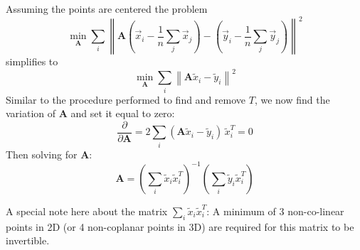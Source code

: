 Assuming the points are centered the problem
\begin{equation}
\underset{\mathbf{A}}{\min}\sum_i\left\|\mathbf{A}\left(\vec{x}_i-\frac{1}{n}\sum_j \vec{x}_j\right) - \left(\vec{y}_i-\frac{1}{n}\sum_j \vec{y}_j\right)\right\|^2
\end{equation}
simplifies to
\begin{equation}
\underset{\mathbf{A}}{\min}\sum_i\left\|\mathbf{A}\tilde{x}_i - \tilde{y}_i\right\|^2
\end{equation}
Similar to the procedure performed to find and remove $T$, we now find the variation of $\mathbf{A}$ and set it equal to zero:
\begin{equation}
\frac{\partial}{\partial\mathbf{A}} = 2 \sum_i \left(\mathbf{A}\tilde{x}_i-\tilde{y}_i\right)\, \tilde{x}_i^T = 0
\end{equation}
Then solving for $\mathbf{A}$:
\begin{equation}
\mathbf{A}=\left(\sum_i\tilde{x}_i\tilde{x}_i^T\right)^{-1}\left(\sum_i\tilde{y}_i\tilde{x}_i^T\right)
\end{equation}

A special note here about the matrix $\sum_i\tilde{x}_i\tilde{x}_i^T$: A minimum of 3 non-co-linear points in 2D (or 4 non-coplanar points in 3D) are required for this matrix to be invertible. 

